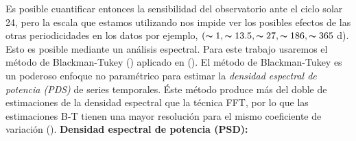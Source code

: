 Es posible cuantificar entonces la sensibilidad del observatorio ante el ciclo solar 24, pero la escala que estamos utilizando nos impide ver los posibles efectos de las otras periodicidades en los datos por ejemplo, $( \thicksim 1, \thicksim13.5,\thicksim27, \thicksim186, \thicksim365$ d). Esto es posible mediante un análisis espectral. Para este trabajo usaremos el método de Blackman-Tukey (\cite{blackman}) aplicado en (\cite{noelia_2023}). El método de Blackman-Tukey es un poderoso enfoque no paramétrico para estimar la \textit{densidad espectral de potencia (PDS)} de series temporales. Éste método produce más del doble de estimaciones de la densidad espectral que la técnica FFT, por lo que las estimaciones B-T tienen una mayor resolución para el mismo coeficiente de variación (\cite{edge_1970}). 
\textbf{Densidad espectral de potencia (PSD):}

